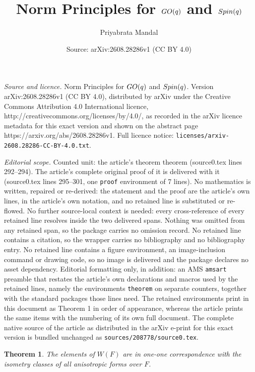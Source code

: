 \documentclass[10pt,a4paper]{amsart}
\title{Norm Principles for ${\rm GO}(q)$ and ${\rm Spin}(q)$}
\author{Priyabrata Mandal}
\date{Source: arXiv:2608.28286v1 (CC BY 4.0)}
\newtheorem{theorem}{Theorem}
\begin{document}
\maketitle

\noindent\emph{Source and licence.} Norm Principles for ${\rm GO}(q)$ and ${\rm Spin}(q)$. Version arXiv:2608.28286v1 (CC BY 4.0), distributed by arXiv under the Creative Commons Attribution 4.0 International licence, http://creativecommons.org/licenses/by/4.0/, as recorded in the arXiv licence metadata for this exact version and shown on the abstract page https://arxiv.org/abs/2608.28286v1. Full licence notice: \texttt{licenses/arxiv-2608.28286-CC-BY-4.0.txt}.\par\smallskip

\noindent\textit{Editorial scope.} Counted unit: the article's theorem theorem (source0.tex lines 292--294). The article's complete original proof of it is delivered with it (source0.tex lines 295--301, one \texttt{proof} environment of 7 lines). No mathematics is written, repaired or re-derived: the statement and the proof are the article's own lines, in the article's own notation, and no retained line is substituted or re-flowed.  No further source-local context is needed: every cross-reference of every retained line resolves inside the two delivered spans.  Nothing was omitted from any retained span, so the package carries no omission record.  No retained line contains a citation, so the wrapper carries no bibliography and no bibliography entry.  No retained line contains a figure environment, an image-inclusion command or drawing code, so no image is delivered and the package declares no asset dependency.  Editorial formatting only, in addition: an AMS \texttt{amsart} preamble that restates the article's own declarations and macros used by the retained lines, namely the environments \texttt{theorem} on separate counters, together with the standard packages those lines need.  The retained environments print in this document as Theorem 1 in order of appearance, whereas the article prints the same items with the numbering of its own full document.  The complete native source of the article as distributed in the arXiv e-print for this exact version is bundled unchanged as \texttt{sources/208778/source0.tex}.
\begin{theorem}
    The elements of $W(F)$ are in one-one correspondence with the isometry classes of all anisotropic forms over $F$.
\end{theorem}
\end{document}
